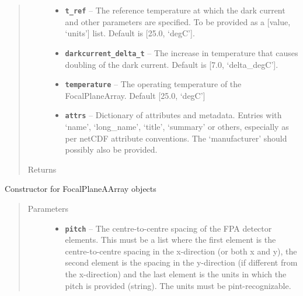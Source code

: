 \documentclass[a4paper,10pt,english]{sphinxmanual}
\begin{document}
\begin{fulllineitems}
\begin{quote}
\begin{description}
\begin{itemize}
\item {} 
\textbf{\texttt{t\_ref}} -- The reference temperature at which the dark current and other parameters are specified.
To be provided as a {[}value, `units'{]} list. Default is {[}25.0, `degC'{]}.

\item {} 
\textbf{\texttt{darkcurrent\_delta\_t}} -- The increase in temperature that causes doubling of the dark current.
Default is {[}7.0, `delta\_degC'{]}.

\item {} 
\textbf{\texttt{temperature}} -- The operating temperature of the FocalPlaneArray. Default {[}25.0, `degC'{]}

\item {} 
\textbf{\texttt{attrs}} -- Dictionary of attributes and metadata. Entries with `name', `long\_name', `title',
`summary' or others, especially as per netCDF attribute conventions.
The `manufacturer' should possibly also be provided.

\end{itemize}

\item[{Returns}] \leavevmode


\end{description}\end{quote}

\begin{fulllineitems}
\label{packages:electro.FocalPlaneArray.__init__}
Constructor for FocalPlaneAArray objects
\begin{quote}\begin{description}
\item[{Parameters}] \leavevmode\begin{itemize}
\item {} 
\textbf{\texttt{pitch}} -- The centre-to-centre spacing of the FPA detector elements. This must be a list where the
first element is the centre-to-centre spacing in the x-direction (or both x and y), the second element is
the spacing in the y-direction (if different from the x-direction) and the last element is the units
in which the pitch is provided (string). The units must be pint-recognizable.


\end{itemize}
\end{description}
\end{quote}
\end{fulllineitems}
\end{fulllineitems}
\end{document}
